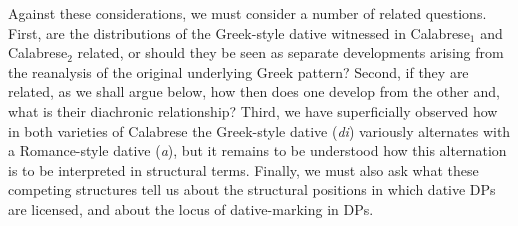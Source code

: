 \documentclass[12pt]{article}
\newcommand\textsubscript[1]{\ensuremath{{}_{\text{#1}}}}
\newenvironment{styleStandard}{\setlength\leftskip{0cm}\setlength\rightskip{0cm plus 1fil}\setlength\parindent{0cm}\setlength\parfillskip{0pt plus 1fil}\setlength\parskip{0cm plus 1pt}\writerlistparindent\writerlistleftskip\leavevmode\normalfont\normalsize\writerlistlabel\ignorespaces}{\unskip\vspace{0cm plus 1pt}\par}
\newcommand\writerlistleftskip{}
\newcommand\writerlistparindent{}
\newcommand\writerlistlabel{}
\begin{document}
\begin{styleStandard}
Against these considerations, we must consider a number of related questions. First, are the distributions of the Greek-style dative witnessed in Calabrese\textsubscript{1} and Calabrese\textsubscript{2} related, or should they be seen as separate developments arising from the reanalysis of the original underlying Greek pattern? Second, if they are related, as we shall argue below, how then does one develop from the other and, what is their diachronic relationship? Third, we have superficially observed how in both varieties of Calabrese the Greek-style dative (\textit{di}) variously alternates with a Romance-style dative (\textit{a}), but it remains to be understood how this alternation is to be interpreted in structural terms. Finally, we must also ask what these competing structures tell us about the structural positions in which dative DPs are licensed, and about the locus of dative-marking in DPs.
\end{styleStandard}
\end{document}

